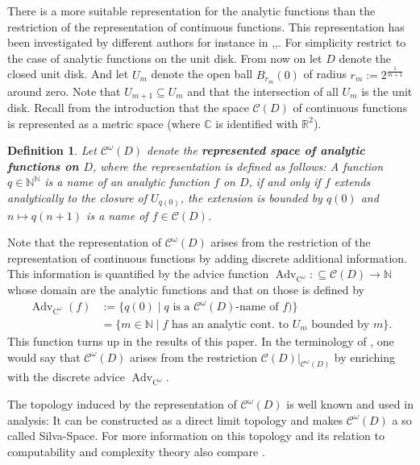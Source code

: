 \documentclass{eptcs-modified}
\newtheorem{definition}[theorem]{Definition}
\newcommand{\Baire}{{\mathbb{N}^\mathbb{N}}}
\newcommand{\demph}{\textbf}
\newcommand{\C}{\textrm{C}}
\newcommand{\NN}{\mathbb{N}}
\newcommand{\RR}{\mathbb{R}}
\newcommand{\CC}{\mathbb{C}}
\newcommand{\analytic}{\mathcal C^\omega(D)}
\newcommand{\cont}{\mathcal C(D)}
\newcommand{\Advc}{\operatorname{Adv}_{\C^\omega}}
\begin{document}
			There is a more suitable representation for the analytic functions than the restriction of the representation of continuous functions.
			This representation has been investigated by different authors for instance in \cite{MR3377508},\cite{MR2207129},\cite{Muller1995}.
			For simplicity restrict to the case of analytic functions on the unit disk.
			From now on let $D$ denote the closed unit disk.
			And let $U_m$ denote the open ball  $B_{r_m}(0)$ of radius $r_m :=2^{\frac 1{m+1}}$ around zero.
			Note that $U_{m+1}\subseteq U_m$ and that the intersection of all $U_m$ is the unit disk.
			Recall from the introduction that the space $\cont$ of continuous functions is represented as a metric space (where $\CC$ is identified with $\RR^2$).
			\begin{definition}\label{def:analytic rep}
				Let $\analytic$ denote the \demph{represented space of analytic functions on $D$}, where the representation is defined as follows:
				A function $q\in \Baire$ is a name of an analytic function $f$ on $D$, if and only if $f$ extends analytically to the closure of $U_{q(0)}$, the extension is bounded by $q(0)$ and $n\mapsto q(n+1)$ is a name of $f\in \cont$.
			\end{definition}

			Note that the representation of $\analytic$ arises from the restriction of the representation of continuous functions by adding discrete additional information.
			This information is quantified by the advice function $\Advc:\subseteq\cont \to \NN$ whose domain are the analytic functions and that on those is defined by
			\begin{equation}\label{eq:AC}
				\tag{AC}
				\begin{split}
					\Advc(f) & := \{q(0)\mid q\text{ is a $\analytic$-name of $f$})\} \\
					& = \{m\in\NN\mid f\text{ has an analytic cont. to }U_m\text{ bounded by }m\}.
				\end{split}
			\end{equation}
			This function turns up in the results of this paper.
			In the terminology of \cite{MR3377508}, one would say that $\analytic$ arises from the restriction $\cont|_{\analytic}$ by enriching with the discrete advice $\Advc$.

			The topology induced by the representation of $\analytic$ is well known and used in analysis:
			It can be constructed as a direct limit topology and makes $\analytic$ a so called Silva-Space.
			For more information on this topology and its relation to computability and complexity theory also compare \cite{MR2207129}.
\end{document}
